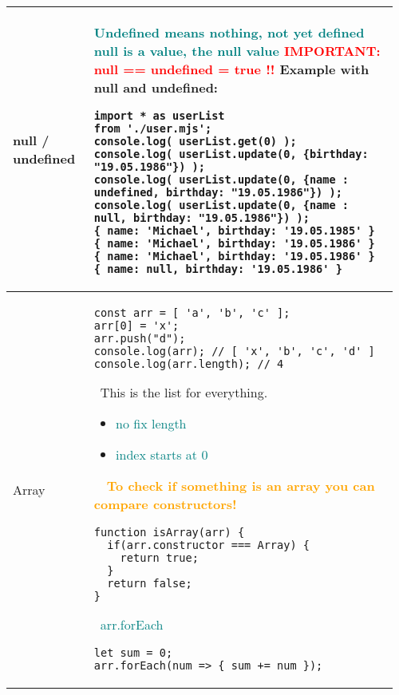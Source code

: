 \documentclass[main.tex,fontsize=8pt,paper=a4,paper=portrait,DIV=calc,]{scrartcl}
\begin{document}
\begin{table}[ht!]
\begin{tabular}{|m{0.2\linewidth}|m{0.755\linewidth}|}
\hline
null / undefined & 
\textcolor{teal}{Undefined means nothing, not yet defined}\newline
\textcolor{teal}{null is a value, the null value}\newline
\textcolor{red}{IMPORTANT: null == undefined = true !!}\newline
Example with null and undefined:\newline
\begin{lstlisting}
import * as userList
from './user.mjs';
console.log( userList.get(0) );
console.log( userList.update(0, {birthday: "19.05.1986"}) );
console.log( userList.update(0, {name : undefined, birthday: "19.05.1986"}) );
console.log( userList.update(0, {name : null, birthday: "19.05.1986"}) );
{ name: 'Michael', birthday: '19.05.1985' }
{ name: 'Michael', birthday: '19.05.1986' }
{ name: 'Michael', birthday: '19.05.1986' }
{ name: null, birthday: '19.05.1986' }
\end{lstlisting}
\\
\hline
Array & 
\begin{lstlisting}
const arr = [ 'a', 'b', 'c' ];
arr[0] = 'x';
arr.push("d");
console.log(arr); // [ 'x', 'b', 'c', 'd' ]
console.log(arr.length); // 4
\end{lstlisting}
\, \newline
This is the list for everything.\newline
\begin{itemize}
  \item \textcolor{teal}{no fix length}
  \item \textcolor{teal}{index starts at 0}
  \vspace{-3mm}
\end{itemize}
\, \newline
\, \newline
\textcolor{orange}{\textbf{To check if something is an array you can compare constructors!}}\newline
\begin{lstlisting}
function isArray(arr) {
  if(arr.constructor === Array) {
    return true;
  }
  return false;
}
\end{lstlisting}
\, \newline
\textcolor{teal}{arr.forEach}\newline
\begin{lstlisting}
let sum = 0;
arr.forEach(num => { sum += num });

\end{lstlisting}
\end{tabular}
\end{table}
\end{document}
